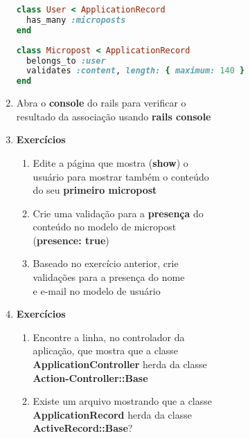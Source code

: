 \documentclass[a4paper,12pt]{article}
\begin{document}
\begin{enumerate}
    \begin{lstlisting}[language=Ruby, title=app/models/user.rb]
class User < ApplicationRecord
  has_many :microposts
end
    \end{lstlisting}

    \begin{lstlisting}[language=Ruby, title=app/models/micropost.rb]
class Micropost < ApplicationRecord
  belongs_to :user
  validates :content, length: { maximum: 140 }
end
    \end{lstlisting}

  \item Abra o \textbf{console} do rails para verificar o \\
        resultado da associação usando \textbf{rails console}

  \item \textbf{Exercícios}

    \begin{enumerate}
      \item Edite a página que mostra (\textbf{show}) o \\
            usuário para mostrar também o conteúdo \\
            do seu \textbf{primeiro micropost}
      \item Crie uma validação para a \textbf{presença} do \\
            conteúdo no modelo de micropost \\
            (\textbf{presence: true})
      \item Baseado no exercício anterior, crie \\
            validações para a presença do nome \\
            e e-mail no modelo de usuário
    \end{enumerate}

  \item \textbf{Exercícios}

    \begin{enumerate}
      \item Encontre a linha, no controlador da \\
            aplicação, que mostra que a classe \\
            \textbf{ApplicationController} herda da classe \\
            \textbf{Action-Controller::Base}
      \item Existe um arquivo mostrando que a classe \\
            \textbf{ApplicationRecord} herda da classe \\
            \textbf{ActiveRecord::Base}?
    \end{enumerate}


\end{enumerate}
\end{document}
